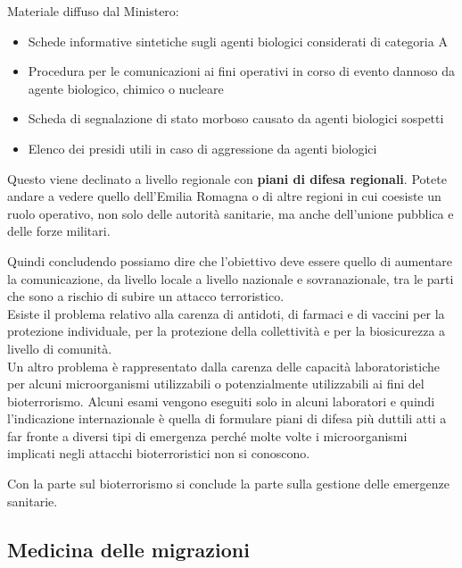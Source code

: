 Materiale diffuso dal Ministero:\\
\begin{itemize}
\item Schede informative sintetiche sugli agenti biologici considerati di
categoria A
\item Procedura per le comunicazioni ai fini operativi in corso di evento
dannoso da agente biologico, chimico o nucleare
\item Scheda di segnalazione di stato morboso causato da agenti biologici
sospetti
\item Elenco dei presidi utili in caso di aggressione da agenti biologici
\end{itemize}

Questo viene declinato a livello regionale con \textbf{piani di difesa
regionali}. Potete andare a vedere quello dell'Emilia Romagna o di altre
regioni in cui coesiste un ruolo operativo, non solo delle autorità
sanitarie, ma anche dell'unione pubblica e delle forze militari.

Quindi concludendo possiamo dire che l'obiettivo deve essere quello di
aumentare la comunicazione, da livello locale a livello nazionale e
sovranazionale, tra le parti che sono a rischio di subire un attacco
terroristico.\\
Esiste il problema relativo alla carenza di antidoti, di farmaci e di
vaccini per la protezione individuale, per la protezione della
collettività e per la biosicurezza a livello di comunità.\\
Un altro problema è rappresentato dalla carenza delle capacità
laboratoristiche per alcuni microorganismi utilizzabili o potenzialmente
utilizzabili ai fini del bioterrorismo. Alcuni esami vengono eseguiti
solo in alcuni laboratori e quindi l'indicazione internazionale è quella
di formulare piani di difesa più duttili atti a far fronte a diversi
tipi di emergenza perché molte volte i microorganismi implicati negli
attacchi bioterroristici non si conoscono.

Con la parte sul bioterrorismo si conclude la parte sulla gestione delle
emergenze sanitarie.

\subsection{Medicina delle migrazioni}

